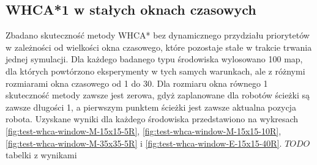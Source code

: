 \subsection{WHCA*1 w stałych oknach czasowych} %
Zbadano skuteczność metody WHCA* bez dynamicznego przydziału priorytetów w zależności od wielkości okna czasowego, które pozostaje stałe w trakcie trwania jednej symulacji.
Dla każdego badanego typu środowiska wylosowano 100 map, dla których powtórzono eksperymenty w tych samych warunkach, ale z różnymi rozmiarami okna czasowego od 1 do 30.
Dla rozmiaru okna równego 1 skuteczność metody zawsze jest zerowa, gdyż zaplanowane dla robotów ścieżki są zawsze długości 1, a pierwszym punktem ścieżki jest zawsze aktualna pozycja robota.
Uzyskane wyniki dla każdego środowiska przedstawiono na wykresach \ref{fig:test-whca-window-M-15x15-5R}, \ref{fig:test-whca-window-M-15x15-10R}, \ref{fig:test-whca-window-M-35x35-5R} i \ref{fig:test-whca-window-E-15x15-40R}.
$TODO$ tabelki z wynikami

